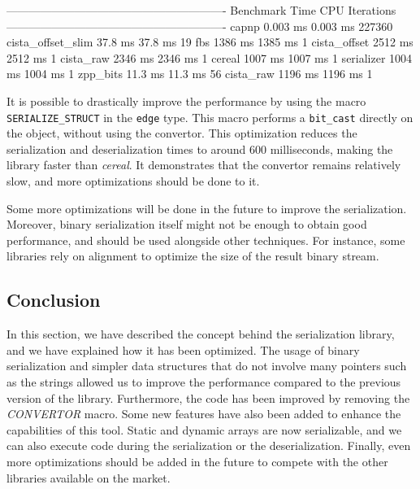 \begin{terminal}
----------------------------------------------------------
Benchmark                Time             CPU   Iterations
----------------------------------------------------------
capnp                0.003 ms        0.003 ms       227360
cista_offset_slim     37.8 ms         37.8 ms           19
fbs                   1386 ms         1385 ms            1
cista_offset          2512 ms         2512 ms            1
cista_raw             2346 ms         2346 ms            1
cereal                1007 ms         1007 ms            1
serializer            1004 ms         1004 ms            1
zpp_bits              11.3 ms         11.3 ms           56
cista_raw             1196 ms         1196 ms            1
\end{terminal}\leavevmode\newline

It is possible to drastically improve the performance by using the macro
\texttt{SERIALIZE\_STRUCT} in the \texttt{edge} type. This macro performs a
\texttt{bit\_cast} directly on the object, without using the convertor. This
optimization reduces the serialization and deserialization times to around 600
milliseconds, making the library faster than \textit{cereal}. It demonstrates
that the convertor remains relatively slow, and more optimizations should be
done to it.

Some more optimizations will be done in the future to improve the serialization.
Moreover, binary serialization itself might not be enough to obtain good
performance, and should be used alongside other techniques. For instance, some
libraries rely on alignment to optimize the size of the result binary stream.

\subsection{Conclusion}

In this section, we have described the concept behind the serialization library,
and we have explained how it has been optimized. The usage of binary
serialization and simpler data structures that do not involve many pointers such
as the strings allowed us to improve the performance compared to the previous
version of the library. Furthermore, the code has been improved by removing the
\textit{CONVERTOR} macro. Some new features have also been added to enhance the
capabilities of this tool. Static and dynamic arrays are now serializable, and
we can also execute code during the serialization or the deserialization.
Finally, even more optimizations should be added in the future to compete with
the other libraries available on the market.
